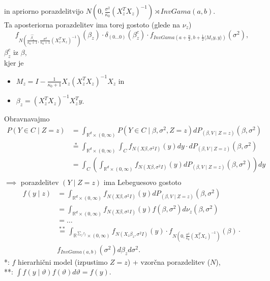 \documentclass[a4paper, 12pt]{book}
\theoremstyle{definition}
\theoremstyle{remark}
\newcommand{\R}{\mathbb{R}}
\begin{document}
in apriorno porazdelitvijo $N\left(0, \frac{\sigma^2}{\kappa_0} (X_z^T X_z)^{-1}\right) \rtimes InvGama(a, b)$. \\
Ta aposteriorna porazdelitev ima torej gostoto (glede na $\nu_z$)
\begin{equation*}
  f_{N\left(\frac{\hat{\beta_z}}{\kappa_0+1}, \frac{\sigma^2}{\kappa_0+1} (X_z^T X_z)^{-1}\right)}(\beta_z)
  \cdot \delta_{(0 \dots 0)} (\beta_z^c)
  \cdot f_{InvGama\left(a + \frac{n}{2}, b + \frac{1}{2} \langle M_z y, y \rangle\right)} (\sigma^2),
\end{equation*}
$\beta_z^c$  iz $\beta$, \\
kjer je
\begin{itemize}[label={}]
  \item $M_z = I - \frac{1}{\kappa_0+1} X_z (X_z^T X_z)^{-1} X_z$ in
  \item $\beta_z = (X_z^T X_z)^{-1} X_z^T y$.
\end{itemize}
Obravnavajmo
\begin{align*}
  P(Y \in C \mid Z=z) &= \int_{\R^d \times (0, \infty)} P(Y \in C \mid \beta, \sigma^2, Z=z)
    dP_{(\beta, V \mid Z=z)}(\beta, \sigma^2) \\
  &\stackrel{*}{=} \int_{\R^d \times (0, \infty)} \int_C f_{N(X \beta, \sigma^2 I)}(y) dy
    \cdot dP_{(\beta, V \mid Z=z)}(\beta, \sigma^2) \\
  &= \int_C \left( \int_{\R^d \times (0, \infty)} f_{N(X \beta, \sigma^2 I)}(y) dP_{(\beta, V \mid Z=z)}(\beta, \sigma^2)
    \right) dy \\
\end{align*}
$\implies$ porazdelitev $(Y \mid Z=z)$ ima Lebeguesovo gostoto
\begin{align*}
  f(y \mid z) &= \int_{\R^d \times (0, \infty)} f_{N(X \beta, \sigma^2 I)}(y) dP_{(\beta, V \mid Z=z)}(\beta, \sigma^2) \\
  &= \int_{\R^d \times (0, \infty)} f_{N(X \beta, \sigma^2 I)}(y) f(\beta, \sigma^2) d\nu_z(\beta, \sigma^2) \\
  &= \dots \\
  &\stackrel{**}{=} \int_{\R^{\sum_j z_j} \times (0, \infty)} f_{N(X_z \beta_z, \sigma^2 I)}(y) \cdot
    f_{N\left(0, \frac{\sigma^2}{\kappa_0} (X_z^T X_z)^{-1}\right)}(\beta) \cdot \\
  &f_{InvGama(a, b)}(\sigma^2) d\beta_z d\sigma^2.
\end{align*}
*: $f$ hierarhični model (izpustimo $Z=z$) + vzorčna porazdelitev ($N$), \\
**: $\int f(y \mid \vartheta) f(\vartheta) d\vartheta = f(y)$. \\
\end{document}
